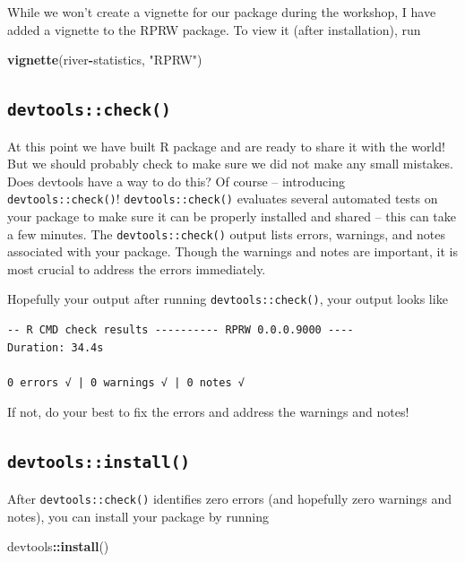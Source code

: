 \documentclass[
]{book}
\newenvironment{Shaded}{\begin{snugshade}}{\end{snugshade}}
\newcommand{\KeywordTok}[1]{\textcolor[rgb]{0.13,0.29,0.53}{\textbf{#1}}}
\newcommand{\NormalTok}[1]{#1}
\newcommand{\OperatorTok}[1]{\textcolor[rgb]{0.81,0.36,0.00}{\textbf{#1}}}
\newcommand{\StringTok}[1]{\textcolor[rgb]{0.31,0.60,0.02}{#1}}
\begin{document}
While we won't create a vignette for our package during the workshop, I have added a vignette to the RPRW package. To view it (after installation), run

\begin{Shaded}
\begin{Highlighting}[]
\KeywordTok{vignette}\NormalTok{(river}\OperatorTok{-}\NormalTok{statistics, }\StringTok{"RPRW"}\NormalTok{)}
\end{Highlighting}
\end{Shaded}

\hypertarget{check}{%
\subsection{\texorpdfstring{\texttt{devtools::check()}}{devtools::check()}}\label{check}}

At this point we have built R package and are ready to share it with the world! But we should probably check to make sure we did not make any small mistakes. Does devtools have a way to do this? Of course -- introducing \texttt{devtools::check()}! \texttt{devtools::check()} evaluates several automated tests on your package to make sure it can be properly installed and shared -- this can take a few minutes. The \texttt{devtools::check()} output lists errors, warnings, and notes associated with your package. Though the warnings and notes are important, it is most crucial to address the errors immediately.

Hopefully your output after running \texttt{devtools::check()}, your output looks like

\begin{verbatim}
-- R CMD check results ---------- RPRW 0.0.0.9000 ----
Duration: 34.4s

0 errors √ | 0 warnings √ | 0 notes √
\end{verbatim}

If not, do your best to fix the errors and address the warnings and notes!

\hypertarget{install}{%
\subsection{\texorpdfstring{\texttt{devtools::install()}}{devtools::install()}}\label{install}}

After \texttt{devtools::check()} identifies zero errors (and hopefully zero warnings and notes), you can install your package by running

\begin{Shaded}
\begin{Highlighting}[]
\NormalTok{devtools}\OperatorTok{::}\KeywordTok{install}\NormalTok{()}
\end{Highlighting}
\end{Shaded}
\end{document}
